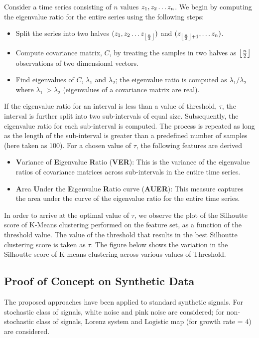 \documentclass[journal]{IEEEtran}
\DeclarePairedDelimiter\floor{\lfloor}{\rfloor}
\begin{document}
Consider a time series consisting of $n$ values  $z_1, z_2 \mathellipsis z_n$. We begin by computing the eigenvalue ratio for the entire series using the following steps:
\begin{itemize}
\item  Split the series into two halves $(z_1, z_2 \mathellipsis z_{\floor*{\frac{n}{2}}})$ and $(z_{\floor*{\frac{n}{2}} + 1}, \mathellipsis z_n)$.
\item Compute covariance matrix, $C$,  by treating the samples in two halves as $\floor*{\frac{n}{2}}$ observations of two dimensional vectors.
\item Find eigenvalues of $C$, $\lambda_1$ and $\lambda_2$; the eigenvalue ratio is computed as  $\lambda_1/\lambda_2$ where $\lambda_1 \ > \lambda_2$ (eigenvalues of a covariance matrix are real).
\end{itemize}
If the eigenvalue ratio for an interval is less than a value of threshold, $\tau$, the interval is further split into two sub-intervals of equal size. Subsequently, the eigenvalue ratio for each sub-interval is computed. The process is repeated as long as the length of the sub-interval is greater than a predefined number of samples (here taken as 100).
For a chosen value of $\tau$, the following features are derived
\begin{itemize}
  \item \textbf{V}ariance of \textbf{E}igenvalue \textbf{R}atio (\textbf{VER}): This is the variance of the eigenvalue ratios of covariance matrices across sub-intervals in the entire time series.
  \item \textbf{A}rea \textbf{U}nder the \textbf{E}igenvalue \textbf{R}atio curve (\textbf{AUER}): This measure captures the area under the curve of the eigenvalue ratio for the entire time series.
\end{itemize}

In order to arrive at the optimal value of $\tau$, we observe  the plot of the Silhoutte score of K-Means clustering performed on the feature set, as a function of the threshold value. The value of the threshold that results in the best Silhoutte clustering score is taken as $\tau$.
The figure below shows the variation in the Silhoutte score of K-means clustering across various values of Threshold.

\subsection{Proof of Concept on Synthetic Data}
The proposed approaches have been applied to standard synthetic signals. For stochastic class of signals, white noise and pink noise are considered; for non-stochastic class of signals, Lorenz system and Logistic map (for growth rate = 4) are considered.
\end{document}
